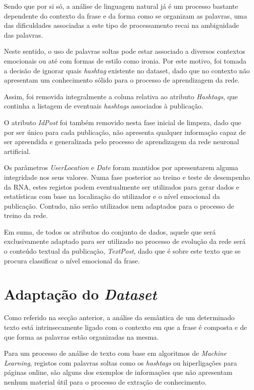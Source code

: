 Sendo que por si só, a análise de linguagem natural já é um processo bastante dependente do contexto da frase e da forma como se organizam as palavras, uma das dificuldades associadas a este tipo de processamento recai na ambiguidade das palavras. 

Neste sentido, o uso de palavras soltas pode estar associado a diversos contextos emocionais ou até com formas de estilo como ironia. Por este motivo, foi tomada a decisão de ignorar quais \textit{hashtag} existente no dataset, dado que no contexto não apresentam um conhecimento sólido para o processo de aprendizagem da rede.

Assim, foi removida integralmente a coluna relativa ao atributo \textit{Hashtags}, que continha a listagem de eventuais \textit{hashtags} associados à publicação. 

O atributo \textit{IdPost} foi também removido nesta fase inicial de limpeza, dado que por ser único para cada publicação, não apresenta qualquer informação capaz de ser apreendida e generalizada pelo processo de aprendizagem da rede neuronal artificial. 

Os parâmetros \textit{UserLocation} e \textit{Date} foram mantidos por apresentarem alguma integridade nos seus valores. 
Numa fase posterior ao treino e teste de desempenho da RNA, estes registos podem eventualmente ser utilizados para gerar dados e estatísticas com base na localização do utilizador e o nível emocional da publicação. Contudo, não serão utilizados nem adaptados para o processo de treino da rede. 

Em suma, de todos os atributos do conjunto de dados, aquele que será exclusivamente adaptado para ser utilizado no processo de evolução da rede será o conteúdo textual da publicação, \textit{TextPost}, dado que é sobre este texto que se procura classificar o nível emocional da frase.

\section{Adaptação do \textit{Dataset}}
\label{sec:AdaptacaoDataset}

Como referido na secção anterior, a análise da semântica de um determinado texto está intrinsecamente ligado com o contexto em que a frase é composta e de que forma as palavras estão organizadas na mesma. 

Para um processo de análise de texto com base em algoritmos de \textit{Machine Learning}, registos com palavras soltas como os \textit{hashtags} ou hiperligações para páginas online, são alguns dos exemplos de informações que não apresentam nenhum material útil para o processo de extração de conhecimento. 

